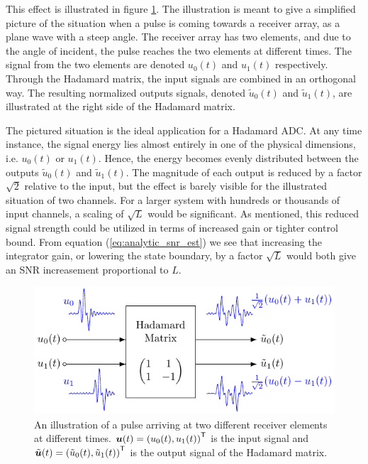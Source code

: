 This effect is illustrated in figure \ref{fig:signal_dimension}. The illustration is meant to give a simplified picture of the situation when a pulse is coming towards a receiver array, as a plane wave with a steep angle. The receiver array has two elements, and due to the angle of incident, the pulse reaches the two elements at different times. The signal from the two elements are denoted $u_0(t)$ and $u_1(t)$ respectively. Through the Hadamard matrix, the input signals are combined in an orthogonal way. The resulting normalized outputs signals, denoted $\tilde{u}_0(t)$ and $\tilde{u}_1(t)$, are illustrated at the right side of the Hadamard matrix.

The pictured situation is the ideal application for a Hadamard ADC. At any time instance, the signal energy lies almost entirely in one of the physical dimensions, i.e. $u_0(t)$ or $u_1(t)$. Hence, the energy becomes evenly distributed between the outputs $\tilde{u}_0(t)$ and $\tilde{u}_1(t)$. The magnitude of each output is reduced by a factor $\sqrt{2}$ relative to the input, but the effect is barely visible for the illustrated situation of two channels. For a larger system with hundreds or thousands of input channels, a scaling of $\sqrt{L}$ would be significant. As mentioned, this reduced signal strength could be utilized in terms of increased gain or tighter control bound. From equation (\ref{eq:analytic_snr_est}) we see that increasing the integrator gain, or lowering the state boundary, by a factor $\sqrt{L}$ would both give an SNR increasement proportional to $L$.
\begin{figure}[htbp]
    \centering
    \includegraphics[width=\linewidth]{figures/05hadamard/signal_dimension.pdf}
    \caption{An illustration of a pulse arriving at two different receiver elements at different times. $\bm{u}(t) = \left( u_0(t) , u_1(t) \right)^\mathsf{T}$ is the input signal and $\tilde{\bm{u}}(t) = \left( \tilde{u}_0(t) , \tilde{u}_1(t) \right)^\mathsf{T}$ is the output signal of the Hadamard matrix.}
    \label{fig:signal_dimension}
\end{figure}


